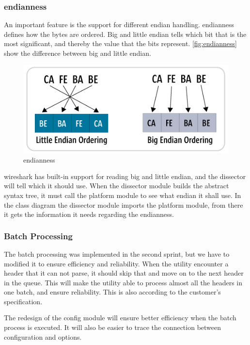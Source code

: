 \subsubsection{\Gls{endianness}}
An important feature is the support for different \gls{endian} handling. \Gls{endianness} defines how the bytes are ordered. Big and little endian tells which bit that is the most significant, and thereby the value that the bits represent. \autoref{fig:endianness}\cite{Endianness} show the difference between big and little endian.
\begin{figure}[!htb]
	\includegraphics[width=\textwidth]{./sprints/img/endianness}
	\caption{\Gls{endianness} \label{fig:endianness}}
\end{figure}
\Gls{wireshark} has built-in support for reading big and little \gls{endian}, and the dissector will tell which it should use. When the \gls{dissector} module builds the abstract syntax tree, it must call the platform module to see what \gls{endian} it shall use. In the class diagram the \gls{dissector} module imports the platform module, from there it gets the information it needs regarding the \gls{endianness}. 

\subsubsection{Batch Processing}
The \gls{batch processing} was implemented in the second sprint, but we have to modified it to ensure efficiency and reliability. When the \gls{utility} encounter a \gls{header} that it can not parse, it should skip that and move on to the next \gls{header} in the queue. This will make the \gls{utility} able to process almost all the \glspl{header} in one batch, and ensure reliability. This is also according to the customer's specification.

The redesign of the config module will ensure better efficiency when the batch process is executed. It will also be easier to trace the connection between configuration and options. 


